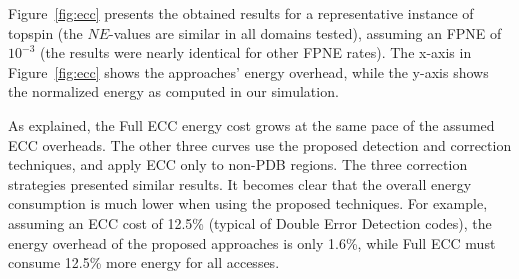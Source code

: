 \documentclass{article}
\begin{document}

Figure~\ref{fig:ecc} presents the obtained results for a representative instance of topspin (the $NE$-values are similar in all domains tested), assuming an FPNE of $10^{-3}$ (the results were nearly identical for other FPNE rates). The x-axis in Figure~\ref{fig:ecc} shows the approaches' energy overhead, while the y-axis shows the normalized energy as computed in our simulation. 

As explained, the Full ECC energy cost grows at the same pace of the assumed ECC overheads. The other three curves use the proposed detection and correction techniques, and apply ECC only to non-PDB regions. The three correction strategies presented similar results.  It becomes clear that the overall energy consumption is much lower when using the proposed techniques. For example, assuming an ECC cost of 12.5\% (typical of Double Error Detection codes), the energy overhead of the proposed approaches is only 1.6\%, while Full ECC must consume 12.5\% more energy for all accesses. 







\end{document}

